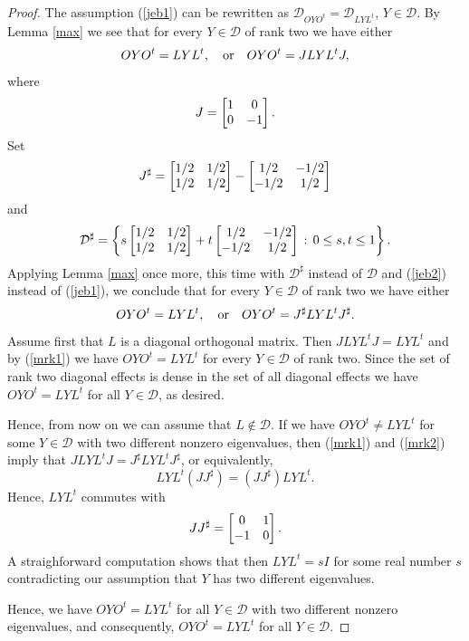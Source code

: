 \documentclass{article}
\begin{document}
\begin{proof}
The assumption (\ref{jeb1}) can be rewritten as $\mathcal{D}_{OYO^t} = \mathcal{D}_{LYL^t}$, $Y \in \mathcal{D}$. By Lemma \ref{max} we see that for every $Y \in \mathcal{D}$ of rank two we have either
\begin{equation}\label{mrk1}
OYO^t = LYL^t , \ \ \ {\rm or} \ \ \ OYO^t = JLYL^t J,
\end{equation}
where 
$$
J= \left[ \begin{matrix} 1& 0 \cr 0 & -1 \cr \end{matrix} \right] .
$$ 
Set
$$
J^\sharp =   \left[ \begin{matrix} 1/2 & 1/2 \cr 1/2 & 1/2 \cr \end{matrix} \right] -  \left[ \begin{matrix} 1/2 & -1/2 \cr -1/2 & 1/2 \cr \end{matrix} \right]
$$
and
$$
\mathcal{D}^\sharp = \left \{   s \left[ \begin{matrix} 1/2 & 1/2 \cr 1/2 & 1/2 \cr \end{matrix} \right] +t  \left[ \begin{matrix} 1/2 & -1/2 \cr -1/2 & 1/2 \cr \end{matrix} \right] \, : \, 0 \le s,t \le 1 \right\} .
$$
Applying Lemma \ref{max} once more, this time with $\mathcal{D}^\sharp$ instead of $\mathcal{D}$ and (\ref{jeb2}) instead of (\ref{jeb1}), we conclude 
that for every $Y \in \mathcal{D}$ of rank two we have either
\begin{equation}\label{mrk2}
OYO^t = LYL^t , \ \ \ {\rm or} \ \ \ OYO^t = J^\sharp LYL^t J^\sharp .
\end{equation}
Assume first that $L$ is a diagonal orthogonal matrix. Then $J LYL^t J =  LYL^t$ and by (\ref{mrk1}) we have $OYO^t = LYL^t$ for every $Y \in \mathcal{D}$ of rank two. Since the set of rank two diagonal effects is dense in the set of all diagonal effects we have $OYO^t = LYL^t$ for all $Y \in \mathcal{D}$, as desired. 

Hence, from now on we can assume that $L \not\in \mathcal{D}$. If we have $OYO^t \not= LYL^t$ for some $Y \in \mathcal{D}$ with two different nonzero eigenvalues, then (\ref{mrk1}) and (\ref{mrk2}) imply that
$ JLYL^t J =  J^\sharp LYL^t J^\sharp$, or equivalently, 
$$
LYL^t (J  J^\sharp)= (J J^\sharp) LYL^t .
$$
Hence, $LYL^t$ commutes with
$$
JJ^\sharp =  \left[ \begin{matrix} 0& 1 \cr -1 & 0 \cr \end{matrix} \right] .
$$
A straighforward computation shows that then $LYL^t = sI$ for some real number $s$ contradicting our assumption that $Y$ has two different eigenvalues.

Hence, we have $OYO^t = LYL^t$ for all $Y \in \mathcal{D}$ with two different nonzero eigenvalues, and consequently, 
$OYO^t = LYL^t$ for all $Y \in \mathcal{D}$.
\end{proof}
\end{document}
